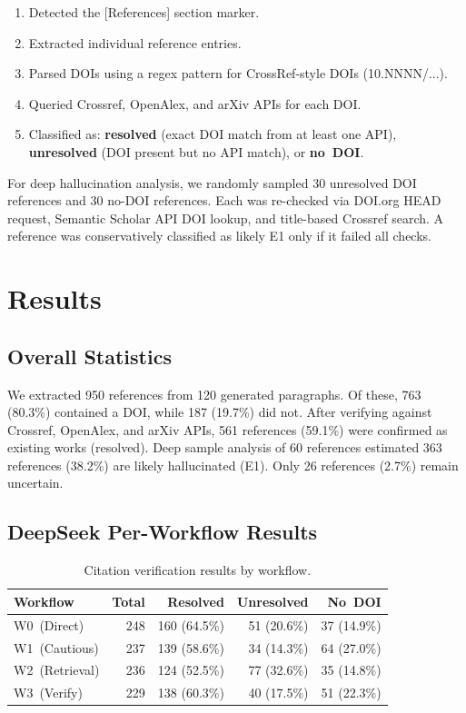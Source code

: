 \documentclass[11pt,a4paper]{article}
\newcommand{\wzero}{W0~}
\newcommand{\wone}{W1~}
\newcommand{\wtwo}{W2~}
\newcommand{\wthree}{W3~}
\begin{document}
\begin{enumerate}[nosep]
    \item Detected the [References] section marker.
    \item Extracted individual reference entries.
    \item Parsed DOIs using a regex pattern for CrossRef-style DOIs (10.NNNN/...).
    \item Queried Crossref, OpenAlex, and arXiv APIs for each DOI.
    \item Classified as: \textbf{resolved} (exact DOI match from at least one API), \textbf{unresolved} (DOI present but no API match), or \textbf{no~DOI}.
\end{enumerate}

For deep hallucination analysis, we randomly sampled 30 unresolved DOI references and 30 no-DOI references. Each was re-checked via DOI.org HEAD request, Semantic Scholar API DOI lookup, and title-based Crossref search. A reference was conservatively classified as likely E1 only if it failed all checks.

\section{Results}
\label{sec:results}

\subsection{Overall Statistics}

We extracted 950 references from 120 generated paragraphs. Of these, 763 (80.3\%) contained a DOI, while 187 (19.7\%) did not. After verifying against Crossref, OpenAlex, and arXiv APIs, 561 references (59.1\%) were confirmed as existing works (resolved). Deep sample analysis of 60 references estimated 363 references (38.2\%) are likely hallucinated (E1). Only 26 references (2.7\%) remain uncertain.

\subsection{DeepSeek Per-Workflow Results}

\begin{table}[ht]
\centering
\begin{tabular}{lrrrr}
\toprule
\textbf{Workflow} & \textbf{Total} & \textbf{Resolved} & \textbf{Unresolved} & \textbf{No~DOI} \\
\midrule
\wzero (Direct)     & 248 & 160 (64.5\%) & 51 (20.6\%) & 37 (14.9\%) \\
\wone (Cautious)    & 237 & 139 (58.6\%) & 34 (14.3\%) & 64 (27.0\%) \\
\wtwo (Retrieval)   & 236 & 124 (52.5\%) & 77 (32.6\%) & 35 (14.8\%) \\
\wthree (Verify)    & 229 & 138 (60.3\%) & 40 (17.5\%) & 51 (22.3\%) \\
\bottomrule
\end{tabular}
\caption{Citation verification results by workflow.}
\label{tab:workflow}
\end{table}
\end{document}
